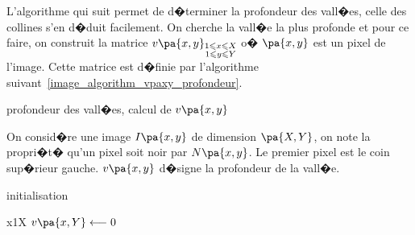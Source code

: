 L'algorithme qui suit permet de d�terminer la profondeur des vall�es, celle des collines s'en d�duit facilement. On cherche la vall�e la plus profonde et pour ce faire, on construit la matrice $v\pa{x,y}_{ \begin{subarray}{c} 1 \leqslant x \leqslant X \\ 1 \leqslant y \leqslant Y \end{subarray}}$ o� $\pa{x,y}$ est un pixel de l'image. Cette matrice est d�finie par l'algorithme suivant~\ref{image_algorithm_vpaxy_profondeur}.


        \begin{xalgorithm}{profondeur des vall�es, calcul de
                                                $v\pa{x,y}$
                                                    }
        \label{image_algorithm_vpaxy_profondeur}
        
        On consid�re une image $I\pa{x,y}$ de dimension $\pa{X,Y}$, on note la propri�t� qu'un pixel 
        soit noir par $N\pa{x,y}$. Le premier pixel est le coin sup�rieur gauche.
        $v\pa{x,y}$ d�signe la profondeur de la vall�e.
                
        \begin{xalgostep}{initialisation}
        \begin{xfor}{x}{1}{X}
            $v\pa{x,Y} \longleftarrow 0$ 
        \end{xfor}
        \end{xalgostep}
            

\end{xalgorithm}
